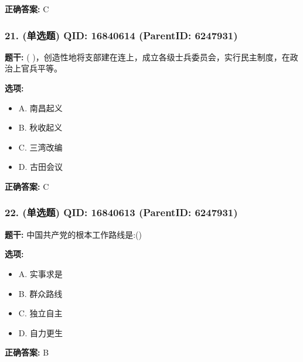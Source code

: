 \documentclass[12pt,UTF8]{ctexart}
\begin{document}
\textbf{正确答案:}
C

\vspace{0.3em}\hrulefill\vspace{0.7em}

\subsubsection*{21. (单选题) \small QID: 16840614 (ParentID: 6247931)}

\textbf{题干:}
( )，创造性地将支部建在连上，成立各级士兵委员会，实行民主制度，在政治上官兵平等。



\textbf{选项:}
\begin{itemize}[leftmargin=*]

  \item A. 南昌起义

  \item B. 秋收起义

  \item C. 三湾改编

  \item D. 古田会议

\end{itemize}

\textbf{正确答案:}
C

\vspace{0.3em}\hrulefill\vspace{0.7em}

\subsubsection*{22. (单选题) \small QID: 16840613 (ParentID: 6247931)}

\textbf{题干:}
中国共产党的根本工作路线是:()



\textbf{选项:}
\begin{itemize}[leftmargin=*]

  \item A. 实事求是

  \item B. 群众路线

  \item C. 独立自主

  \item D. 自力更生

\end{itemize}

\textbf{正确答案:}
B
\end{document}
